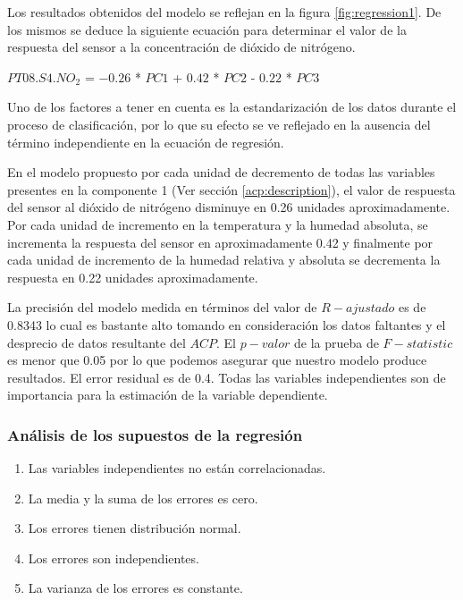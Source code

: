\documentclass[a4paper,10pt,twocolumn]{article}
\begin{document}
  Los resultados obtenidos del modelo se reflejan en la figura \ref{fig:regression1}. De los mismos se deduce la siguiente ecuación para determinar el valor de la respuesta del sensor a la concentración de dióxido de nitrógeno.
  
  \begin{center}
  	$PT08.S4.NO_2$ = $-0.26$ * $PC1$ + $0.42$ * $PC2$ - $0.22$ * $PC3$
  \end{center}

  Uno de los factores a tener en cuenta es la estandarización de los datos durante el proceso de clasificación, por lo que su efecto se ve reflejado en la ausencia del término independiente en la ecuación de regresión.
  
  En el modelo propuesto por cada unidad de decremento de todas las variables presentes en la componente 1 (Ver sección \ref{acp:description}), el valor de respuesta del sensor al dióxido de nitrógeno disminuye en 0.26 unidades aproximadamente. Por cada unidad de incremento en la temperatura y la humedad absoluta, se incrementa la respuesta del sensor en aproximadamente 0.42 y finalmente por cada unidad de incremento de la humedad relativa y absoluta se decrementa la respuesta en 0.22 unidades aproximadamente. 
  
  La precisión del modelo medida en términos del valor de $R-ajustado$ es de 0.8343 lo cual es bastante alto tomando en consideración los datos faltantes y el desprecio de datos resultante del $ACP$. El $p-valor$ de la prueba de $F-statistic$ es menor que 0.05 por lo que podemos asegurar que nuestro modelo produce resultados. El error residual es de 0.4. Todas las variables independientes son de importancia para la estimación de la variable dependiente.
  
  \subsubsection{Análisis de los supuestos de la regresión}
  
  \begin{enumerate}
  	\item Las variables independientes no están correlacionadas.
  	\item La media y la suma de los errores es cero.
  	\item Los errores tienen distribución normal.
  	\item Los errores son independientes.
  	\item La varianza de los errores es constante.
  \end{enumerate}
\end{document}

